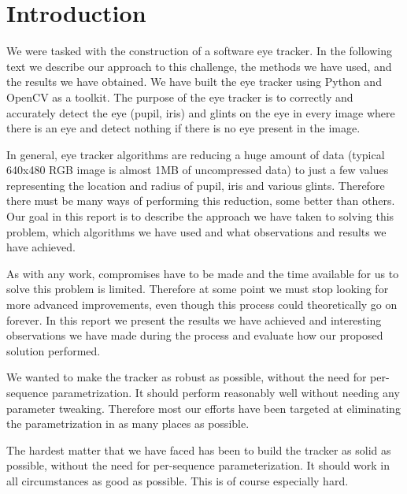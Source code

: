 \section{Introduction}

We were tasked with the construction of a software eye tracker. In the following text we describe our approach to this challenge, the methods we have used, and the results we have obtained.  We have built the eye tracker using Python and OpenCV as a toolkit. The purpose of the eye tracker is to correctly and accurately detect the eye (pupil, iris) and glints on the eye in every image where there is an eye and detect nothing if there is no eye present in the image.

In general, eye tracker algorithms are reducing a huge amount of data (typical 640x480 RGB image is almost 1MB of uncompressed data) to just a few values representing the location and radius of pupil, iris and various glints. Therefore there must be many ways of performing this reduction, some better than others. Our goal in this report is to describe the approach we have taken to solving this problem, which algorithms we have used and what observations and results we have achieved.

As with any work, compromises have to be made and the time available for us to solve this problem is limited. Therefore at some point we must stop looking for more advanced improvements, even though this process could theoretically go on forever. In this report we present the results we have achieved and interesting observations we have made during the process and evaluate how our proposed solution performed.

We wanted to make the tracker as robust as possible, without the need for per-sequence parametrization. It should perform reasonably well without needing any parameter tweaking. Therefore most our efforts have been targeted at eliminating the parametrization in as many places as possible.

The hardest matter that we have faced has been to build the tracker as solid as possible, without the need for per-sequence parameterization. It should work in all circumstances as good as possible. This is of course especially hard.
